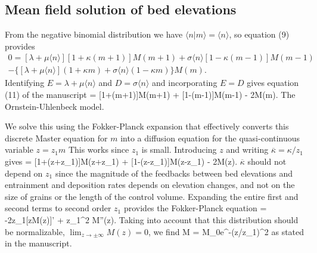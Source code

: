 \subsection{Mean field solution of bed elevations}

From the negative binomial distribution we have $\langle n |m \rangle = \langle n \rangle$, so equation (9) provides 
\begin{multline} 0 = [\lambda + \mu \langle n \rangle][1+\kappa(m+1)]M(m+1) + \sigma \langle n \rangle [1-\kappa(m-1)]M(m-1) \\- \{[\lambda + \mu \langle n \rangle](1+\kappa m) + \sigma \langle n \rangle (1-\kappa m) \}M(m). \end{multline}
Identifying $E=\lambda + \mu \langle n \rangle$ and $D = \sigma \langle n \rangle$ and incorporating $E=D$ gives equation (11) of the manuscript
 = [1+\kappa(m+1)]M(m+1) + [1-\kappa(m-1)]M(m-1) - 2M(m).\ee
The \citet{Martin2014} Ornstein-Uhlenbeck model. 

We solve this using the Fokker-Planck expansion \citep{Gardiner1983} that effectively converts this discrete Master equation for $m$ into a diffusion equation for the quasi-continuous variable $z=z_1 m$ This works since $z_1$ is small. Introducing $z$ and writing $\overline{\kappa}=\kappa/z_1$ gives
 = [1+\overline{\kappa}(z+z_1)]M(z+z_1) + [1-\overline{\kappa}(z-z_1)]M(z-z_1) - 2M(z).\ee
$\overline{\kappa}$ should not depend on $z_1$ since the magnitude of the feedbacks between bed elevations and entrainment and deposition rates depends on elevation changes, and not on the size of grains or the length of the control volume.
Expanding the entire first and second terms to second order $z_1$ provides the Fokker-Planck equation
 = -2\overline{\kappa}z_1[zM(z)]' + z_1^2 M''(z). \ee
Taking into account that this distribution should be normalizable, $\lim_{z\rightarrow \pm \infty}M(z) = 0$, we find
\be M = M_0e^{-\kappa (z/z_1)^2}\ee
as stated in the manuscript.

